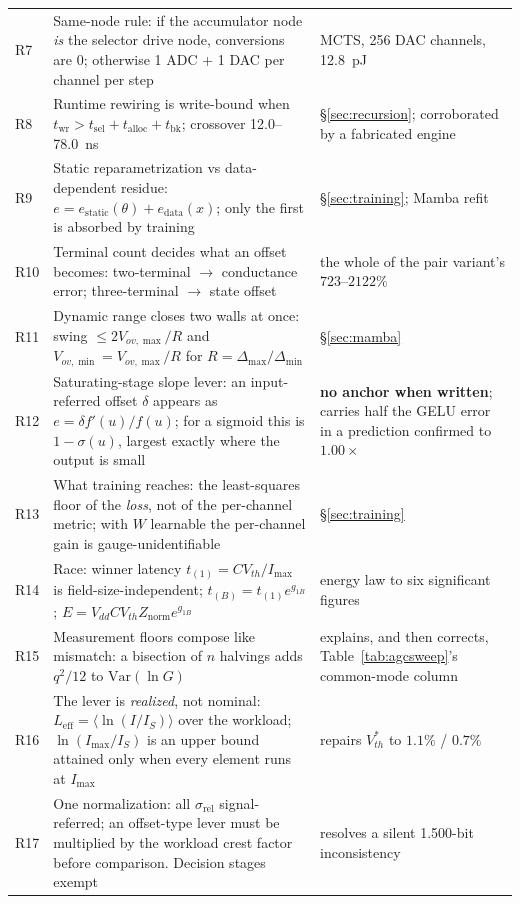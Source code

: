 \documentclass[11pt]{article}
\begin{document}
\begin{table}[t]
\begin{tabular}{p{0.7cm}p{9.6cm}p{4.2cm}}
R7 & Same-node rule: if the accumulator node \textit{is} the selector drive node, conversions are 0; otherwise 1 ADC + 1 DAC per channel per step & MCTS, 256 DAC channels, 12.8~pJ \\
R8 & Runtime rewiring is write-bound when $t_{\mathrm{wr}} > t_{\mathrm{sel}} + t_{\mathrm{alloc}} + t_{\mathrm{bk}}$; crossover 12.0--78.0~ns & \S\ref{sec:recursion}; corroborated by a fabricated engine \\
R9 & Static reparametrization vs data-dependent residue: $e = e_{\mathrm{static}}(\theta) + e_{\mathrm{data}}(x)$; only the first is absorbed by training & \S\ref{sec:training}; Mamba refit \\
R10 & Terminal count decides what an offset becomes: two-terminal $\to$ conductance error; three-terminal $\to$ state offset & the whole of the pair variant's $723$--$2122\%$ \\
R11 & Dynamic range closes two walls at once: swing $\le 2V_{ov,\max}/R$ and $V_{ov,\min} = V_{ov,\max}/R$ for $R = \Delta_{\max}/\Delta_{\min}$ & \S\ref{sec:mamba} \\
R12 & Saturating-stage slope lever: an input-referred offset $\delta$ appears as $e = \delta f'(u)/f(u)$; for a sigmoid this is $1-\sigma(u)$, largest exactly where the output is small & \textbf{no anchor when written}; carries half the GELU error in a prediction confirmed to $1.00\times$ \\
R13 & What training reaches: the least-squares floor of the \textit{loss}, not of the per-channel metric; with $W$ learnable the per-channel gain is gauge-unidentifiable & \S\ref{sec:training} \\
R14 & Race: winner latency $t_{(1)} = CV_{th}/I_{\max}$ is field-size-independent; $t_{(B)} = t_{(1)}e^{g_{1B}}$; $E = V_{dd}CV_{th}Z_{\mathrm{norm}}e^{g_{1B}}$ & energy law to six significant figures \\
R15 & Measurement floors compose like mismatch: a bisection of $n$ halvings adds $q^2/12$ to $\mathrm{Var}(\ln G)$ & explains, and then corrects, Table~\ref{tab:agcsweep}'s common-mode column \\
\midrule
R16 & The lever is \textit{realized}, not nominal: $L_{\mathrm{eff}} = \langle\ln(I/I_S)\rangle$ over the workload; $\ln(I_{\max}/I_S)$ is an upper bound attained only when every element runs at $I_{\max}$ & repairs $V_{th}^\ast$ to $1.1\%$ / $0.7\%$ \\
R17 & One normalization: all $\sigma_{\mathrm{rel}}$ signal-referred; an offset-type lever must be multiplied by the workload crest factor before comparison. Decision stages exempt & resolves a silent 1.500-bit inconsistency \\

\end{tabular}
\end{table}
\end{document}

